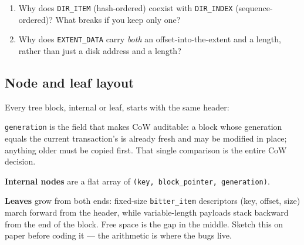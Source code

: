\begin{enumerate}
\def\labelenumi{\arabic{enumi}.}
\tightlist
\item
  Why does \texttt{DIR\_ITEM} (hash-ordered) coexist with \texttt{DIR\_INDEX} (sequence-ordered)?
  What breaks if you keep only one?
\item
  Why does \texttt{EXTENT\_DATA} carry \emph{both} an offset-into-the-extent and a length, rather than
  just a disk address and a length?
\end{enumerate}

\hypertarget{node-and-leaf-layout}{%
\subsection{Node and leaf layout}\label{node-and-leaf-layout}}

Every tree block, internal or leaf, starts with the same header:

\begin{Shaded}
\begin{Highlighting}[]
\OperatorTok{\{}
\OperatorTok{[}\OperatorTok{];}  
\OperatorTok{[}\OperatorTok{];}
\OperatorTok{;}        
\OperatorTok{;}    
\OperatorTok{;}         
\OperatorTok{;}
\OperatorTok{;}         
\OperatorTok{\}}\OperatorTok{;}
\end{Highlighting}
\end{Shaded}

\texttt{generation} is the field that makes CoW auditable: a block whose generation equals the
current transaction's is already fresh and may be modified in place; anything older must
be copied first. That single comparison is the entire CoW decision.

\textbf{Internal nodes} are a flat array of \texttt{(key,\ block\_pointer,\ generation)}.

\textbf{Leaves} grow from both ends: fixed-size \texttt{bitter\_item} descriptors (key, offset, size)
march forward from the header, while variable-length payloads stack backward from the end
of the block. Free space is the gap in the middle. Sketch this on paper before coding it ---
the arithmetic is where the bugs live.

